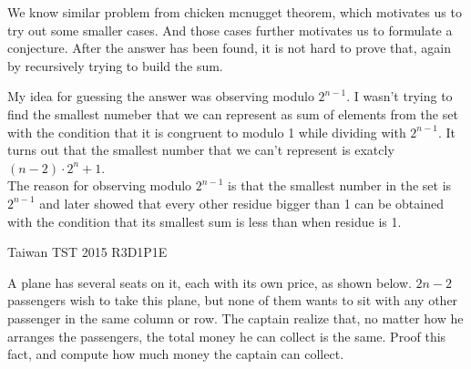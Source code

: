 \begin{solution}
    We know similar problem from chicken mcnugget theorem, which motivates us
    to try out some smaller cases. And those cases further motivates us to
    formulate a conjecture. After the answer has been found, it is not hard to
    prove that, again by recursively trying to build the sum.
\end{solution}

\begin{solution}
    My idea for guessing the answer was observing modulo $2^{n-1}$. I wasn't
    trying to find the smallest numeber that we can represent as sum of
    elements from the set with the condition that it is congruent to modulo 1
    while dividing with $2^{n-1}$. It turns out that the smallest number that
    we can't represent is exatcly $(n-2)\cdot 2^{n} +1$.\\

    The reason for observing modulo $2^{n-1}$ is that the smallest
    number in the set is $2^{n-1}$ and later showed that every other residue
    bigger than 1 can be obtained with the condition that its smallest sum is
    less than when residue is 1.
\end{solution}


{Taiwan TST 2015 R3D1P1}{E}{
    A plane has several seats on it, each with its own price,
    as shown below. $2n-2$ passengers wish to take this plane, but none of
    them wants to sit with any other passenger in the same column or row. The
    captain realize that, no matter how he arranges the passengers, the total
    money he can collect is the same. Proof this fact, and compute how much
    money the captain can collect.  

}

